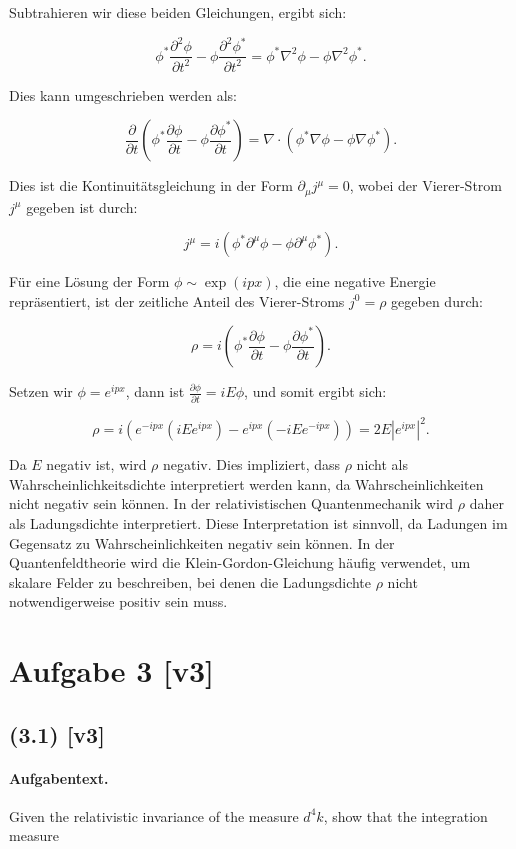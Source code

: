 \documentclass[11pt,a4paper]{article}
\begin{document}
Subtrahieren wir diese beiden Gleichungen, ergibt sich:

\[
\phi^* \frac{\partial^2 \phi}{\partial t^2} - \phi \frac{\partial^2 \phi^*}{\partial t^2} = \phi^* \nabla^2 \phi - \phi \nabla^2 \phi^*.
\]

Dies kann umgeschrieben werden als:

\[
\frac{\partial}{\partial t} \left(\phi^* \frac{\partial \phi}{\partial t} - \phi \frac{\partial \phi^*}{\partial t}\right) = \nabla \cdot \left(\phi^* \nabla \phi - \phi \nabla \phi^*\right).
\]

Dies ist die Kontinuitätsgleichung in der Form \(\partial_\mu j^\mu = 0\), wobei der Vierer-Strom \(j^\mu\) gegeben ist durch:

\[
j^\mu = i\left(\phi^* \partial^\mu \phi - \phi \partial^\mu \phi^*\right).
\]

Für eine Lösung der Form \(\phi \sim \exp(i p x)\), die eine negative Energie repräsentiert, ist der zeitliche Anteil des Vierer-Stroms \(j^0 = \rho\) gegeben durch:

\[
\rho = i\left(\phi^* \frac{\partial \phi}{\partial t} - \phi \frac{\partial \phi^*}{\partial t}\right).
\]

Setzen wir \(\phi = e^{i p x}\), dann ist \(\frac{\partial \phi}{\partial t} = i E \phi\), und somit ergibt sich:

\[
\rho = i\left(e^{-i p x} (i E e^{i p x}) - e^{i p x} (-i E e^{-i p x})\right) = 2 E |e^{i p x}|^2.
\]

Da \(E\) negativ ist, wird \(\rho\) negativ. Dies impliziert, dass \(\rho\) nicht als Wahrscheinlichkeitsdichte interpretiert werden kann, da Wahrscheinlichkeiten nicht negativ sein können. In der relativistischen Quantenmechanik wird \(\rho\) daher als Ladungsdichte interpretiert. Diese Interpretation ist sinnvoll, da Ladungen im Gegensatz zu Wahrscheinlichkeiten negativ sein können. In der Quantenfeldtheorie wird die Klein-Gordon-Gleichung häufig verwendet, um skalare Felder zu beschreiben, bei denen die Ladungsdichte \(\rho\) nicht notwendigerweise positiv sein muss.

\section*{Aufgabe 3 [v3]}
\subsection*{(3.1) [v3]}
\paragraph{Aufgabentext.}
Given the relativistic invariance of the measure $d^4 k$, show that the integration measure
\end{document}
